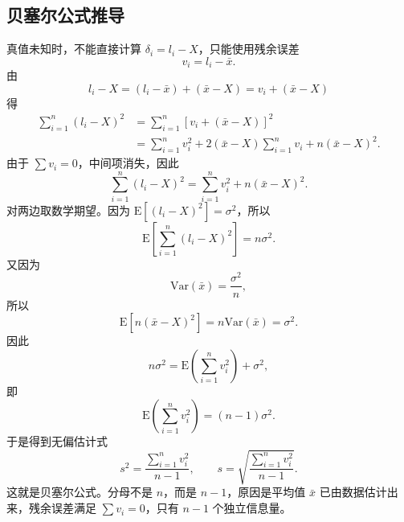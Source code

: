\documentclass[UTF8,12pt,a4paper]{ctexart}
\newcommand{\E}{\mathrm{E}}
\newcommand{\Var}{\mathrm{Var}}
\begin{document}
\subsection{贝塞尔公式推导}
真值未知时，不能直接计算 $\delta_i=l_i-X$，只能使用残余误差
\begin{equation*}
    v_i=l_i-\bar{x} .
\end{equation*}
由
\begin{equation*}
    l_i-X=(l_i-\bar{x})+(\bar{x}-X)=v_i+(\bar{x}-X)
\end{equation*}
得
\begin{equation*}
\begin{aligned}
    \sum_{i=1}^{n}(l_i-X)^2
    &=\sum_{i=1}^{n}\left[v_i+(\bar{x}-X)\right]^2 \\
    &=\sum_{i=1}^{n}v_i^2
      +2(\bar{x}-X)\sum_{i=1}^{n}v_i
      +n(\bar{x}-X)^2 .
\end{aligned}
\end{equation*}
由于 $\sum v_i=0$，中间项消失，因此
\begin{equation*}
    \sum_{i=1}^{n}(l_i-X)^2=\sum_{i=1}^{n}v_i^2+n(\bar{x}-X)^2 .
\end{equation*}
对两边取数学期望。因为 $\E[(l_i-X)^2]=\sigma^2$，所以
\begin{equation*}
    \E\left[\sum_{i=1}^{n}(l_i-X)^2\right]=n\sigma^2 .
\end{equation*}
又因为
\begin{equation*}
    \Var(\bar{x})=\frac{\sigma^2}{n},
\end{equation*}
所以
\begin{equation*}
    \E\left[n(\bar{x}-X)^2\right]=n\Var(\bar{x})=\sigma^2 .
\end{equation*}
因此
\begin{equation*}
    n\sigma^2=\E\left(\sum_{i=1}^{n}v_i^2\right)+\sigma^2,
\end{equation*}
即
\begin{equation*}
    \E\left(\sum_{i=1}^{n}v_i^2\right)=(n-1)\sigma^2 .
\end{equation*}
于是得到无偏估计式
\begin{equation*}
    s^2=\frac{\sum_{i=1}^{n}v_i^2}{n-1},
    \qquad
    s=\sqrt{\frac{\sum_{i=1}^{n}v_i^2}{n-1}} .
\end{equation*}
这就是贝塞尔公式。分母不是 $n$，而是 $n-1$，原因是平均值 $\bar{x}$ 已由数据估计出来，残余误差满足 $\sum v_i=0$，只有 $n-1$ 个独立信息量。

\newpage
\end{document}
